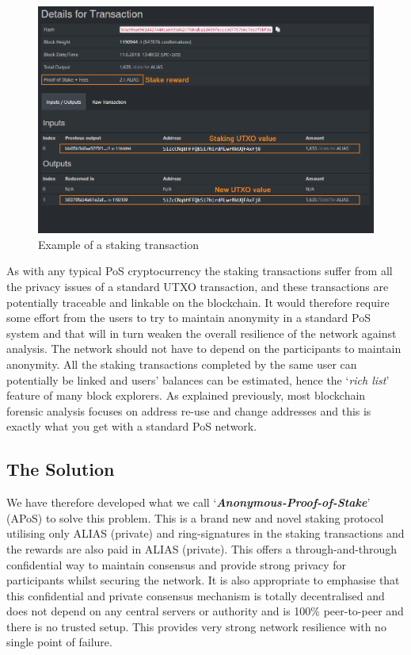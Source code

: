 \begin{figure}[h]
    \centering
    \includegraphics[width=\textwidth]{Images/TxnExample_new.png}
    \caption{Example of a staking transaction}
    \label{fig}
\end{figure}


\noindent
As with any typical PoS cryptocurrency the staking transactions suffer
from all the privacy issues of a standard UTXO transaction, and these
transactions are potentially traceable and linkable on the blockchain.
It would therefore require some effort from the users to try to maintain
anonymity in a standard PoS system and that will in turn weaken the overall
resilience of the network against analysis. The network should not have to
depend on the participants to maintain anonymity. All the staking
transactions completed by the same user can potentially be linked and users’
balances can be estimated, hence the ‘\textit{rich list}’ feature of many
block explorers. As explained previously, most blockchain forensic analysis
focuses on address re-use and change addresses and this is exactly what you
get with a standard PoS network.



\subsection{The Solution}
We have therefore developed what we call ‘\textbf{\textit{Anonymous-Proof-of-Stake}}’
(APoS) to solve this problem. This is a brand new and novel staking protocol
utilising only ALIAS (private) and ring-signatures in the staking transactions and
the rewards are also paid in ALIAS (private). This offers a through-and-through
confidential way to maintain consensus and provide strong privacy for
participants whilst securing the network. It is also appropriate to emphasise
that this confidential and private consensus mechanism is totally
decentralised and does not depend on any central servers or authority and is
100\% peer-to-peer and there is no trusted setup. This provides very strong
network resilience with no single point of failure.

